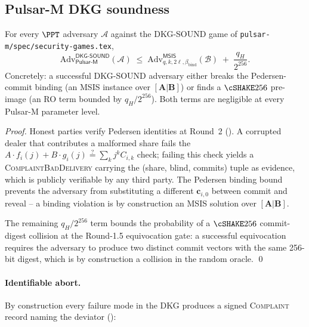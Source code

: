 
\subsection*{Pulsar-M DKG soundness}

\begin{theorem}
\label{thm:pulsar-m-dkg-sound}
For every $\PPT$ adversary $\mathcal{A}$ against the DKG-SOUND game
of \texttt{pulsar-m/spec/security-games.tex},
\[
  \mathrm{Adv}^{\mathsf{DKG\text{-}SOUND}}_{\mathsf{Pulsar\text{-}M}}(\mathcal{A})
  \;\le\;
  \mathrm{Adv}^{\mathsf{MSIS}}_{q, k, 2\ell, \beta_{\mathrm{bind}}}(\mathcal{B})
  \;+\;
  \frac{q_H}{2^{256}}.
\]
Concretely: a successful DKG-SOUND adversary either breaks the
Pedersen-commit binding (an MSIS instance over $[\mathbf{A} | \mathbf{B}]$)
or finds a $\cSHAKE256$ pre-image (an RO term bounded by $q_H /
2^{256}$). Both terms are negligible at every Pulsar-M parameter
level.
\end{theorem}

\begin{proof}
Honest parties verify Pedersen identities at Round~2
(). A corrupted dealer that contributes a malformed
share fails the $A \cdot f_i(j) + B \cdot g_i(j) \stackrel{?}{=}
\sum_k j^k C_{i,k}$ check; failing this check yields a
\textsc{ComplaintBadDelivery} carrying the (share, blind, commits)
tuple as evidence, which is publicly verifiable by any third party.
The Pedersen binding bound prevents the adversary from substituting
a different $\mathbf{c}_{i,0}$ between commit and reveal -- a binding
violation is by construction an MSIS solution over $[\mathbf{A} |
\mathbf{B}]$.

The remaining $q_H / 2^{256}$ term bounds the probability of a
$\cSHAKE256$ commit-digest collision at the Round-1.5 equivocation
gate: a successful equivocation requires the adversary to produce
two distinct commit vectors with the same 256-bit digest, which
is by construction a collision in the random oracle. \qed
\end{proof}

\paragraph{Identifiable abort.}
By construction every failure mode in the DKG produces a signed
\textsc{Complaint} record naming the deviator
():

